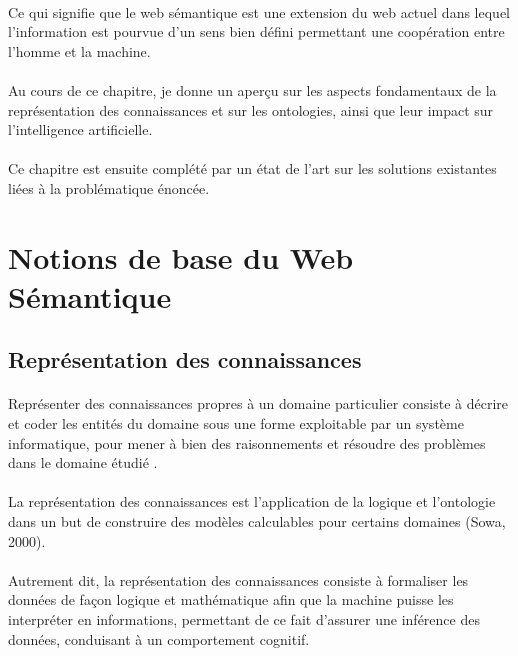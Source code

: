 \documentclass[12pt, a4paper, oneside]{book}
\begin{document}
\paragraph{}
Ce qui signifie que le web sémantique est une extension du web actuel dans lequel l'information est pourvue d'un sens bien défini permettant une coopération entre l'homme et la machine. 
\paragraph{}
Au cours de ce chapitre, je donne un aperçu sur les aspects fondamentaux de la représentation des connaissances et sur les ontologies, ainsi que leur impact sur l'intelligence artificielle.
\paragraph{}
Ce chapitre est ensuite complété par un état de l'art sur les solutions existantes liées à la problématique énoncée.

\section{Notions de base du Web Sémantique}

\subsection{Représentation des connaissances}
\paragraph{}
Représenter des connaissances propres à un domaine particulier consiste à décrire
et coder les entités du domaine sous une forme exploitable par un système
informatique, pour mener à bien des raisonnements et résoudre des problèmes dans le
domaine étudié \citep{kayser}.
\paragraph{}
La représentation des connaissances est l'application
de la logique et l'ontologie dans un but de construire des modèles calculables pour
certains domaines (Sowa, 2000).
\paragraph{}
Autrement dit, la représentation des connaissances consiste à formaliser les données de façon logique et mathématique afin que la machine puisse les interpréter en informations, permettant de ce fait d'assurer une inférence des données, conduisant à un comportement cognitif.
\end{document}
